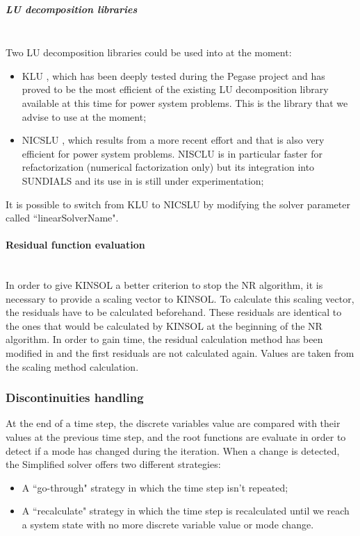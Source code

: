 \documentclass[a4paper, 12pt]{report}
\begin{document}
\subparagraph{LU decomposition libraries}
~~\\

Two LU decomposition libraries could be used into \Dynawo   at the moment:
\begin{itemize}
\item KLU \cite{DavisKLU}, which has been deeply tested during the Pegase project and has proved to be the most efficient of the existing LU decomposition library available at this time for power system problems. This is the library that we advise to use at the moment;
\item NICSLU \cite{chenNicsLu}, which results from a more recent effort and that is also very efficient for power system problems. NISCLU is in particular faster for refactorization (numerical factorization only) but its integration into \ac{SUNDIALS} and its use in \Dynawo is still under experimentation;
\end{itemize}

It is possible to switch from KLU to NICSLU by modifying the solver parameter called ``linearSolverName".

\paragraph{Residual function evaluation}
~~\\

In order to give \ac{KINSOL} a better criterion to stop the \ac{NR} algorithm, it is necessary to provide a scaling vector to \ac{KINSOL}. To calculate this scaling vector, the residuals have to be calculated beforehand. These residuals are identical to the ones that would be calculated by \ac{KINSOL} at the beginning of the \ac{NR} algorithm. In order to gain time, the residual calculation method has been modified in \Dynawo  and the first residuals are not calculated again. Values are taken from the scaling method calculation.

\subsubsection{Discontinuities handling}

At the end of a time step, the discrete variables value are compared with their values at the previous time step, and the root functions are evaluate in order to detect if a mode has changed during the iteration. When a change is detected, the Simplified solver offers two different strategies:
\begin{itemize}
\item A ``go-through" strategy in which the time step isn't repeated;
\item A ``recalculate" strategy in which the time step is recalculated until we reach a system state with no more discrete variable value or mode change.
\end{itemize}
\end{document}
